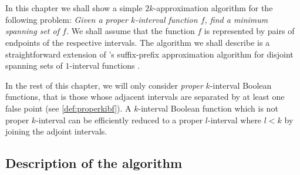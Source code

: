 \chapter{}
\label{chap:2kapprox}

In this chapter
we shall show a simple $2k$-approximation algorithm for the following problem:
\emph{Given a proper $k$-interval function $f$,
find a minimum spanning set of $f$.}
We shall assume that the function $f$ is represented by pairs of endpoints of the respective intervals.
The algorithm we shall describe is a straightforward
extension of
\citeauthor{Schieber2005154}'s suffix-prefix
approximation algorithm
for disjoint spanning sets of $1$-interval functions
\citep[section 6]{Schieber2005154}.

In the rest of this chapter,
we will only consider
\emph{proper} $k$-interval Boolean functions,
that is those whose adjacent intervals are separated by
at least one false point
(see \cref{def:properkibf}).
A $k$-interval Boolean function
which is not proper $k$-interval
can be efficiently reduced to a proper $l$-interval
where $l < k$
by joining the adjoint
intervals.

\section{Description of the algorithm}

